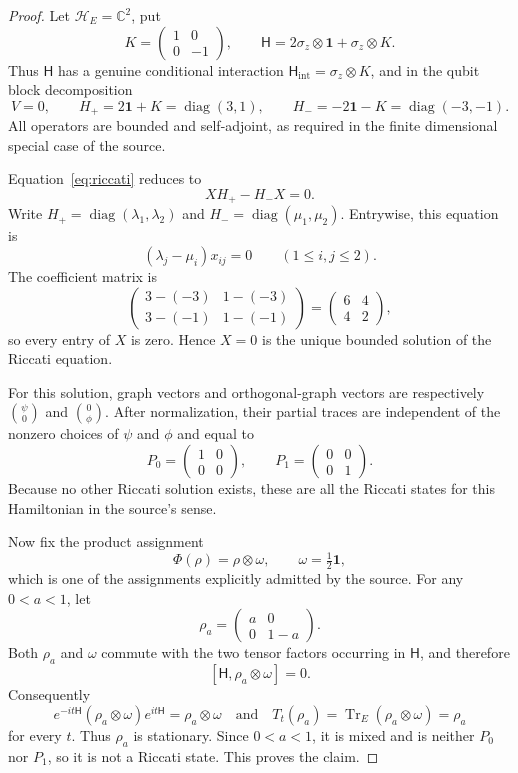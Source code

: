 \documentclass[11pt]{article}
\newcommand{\C}{\mathbb{C}}
\newcommand{\Tr}{\operatorname{Tr}}
\newcommand{\id}{\mathbf{1}}
\newcommand{\HH}{\mathsf{H}}
\begin{document}
\begin{proof}
Let $\mathcal H_E=\C^2$, put
\[
 K=\begin{pmatrix}1&0\\0&-1\end{pmatrix},\qquad
 \HH=2\sigma_z\otimes\id+\sigma_z\otimes K.
\]
Thus $\HH$ has a genuine conditional interaction
$\HH_{\mathrm{int}}=\sigma_z\otimes K$, and in the qubit block decomposition
\[
 V=0,\qquad
 H_+=2\id+K=\operatorname{diag}(3,1),\qquad
 H_-=-2\id-K=\operatorname{diag}(-3,-1).
\]
All operators are bounded and self-adjoint, as required in the finite
dimensional special case of the source.

Equation~\eqref{eq:riccati} reduces to
\[
 XH_+-H_-X=0.
\]
Write $H_+=\operatorname{diag}(\lambda_1,\lambda_2)$ and
$H_-=\operatorname{diag}(\mu_1,\mu_2)$. Entrywise, this equation is
\[
 (\lambda_j-\mu_i)x_{ij}=0\qquad(1\le i,j\le2).
\]
The coefficient matrix is
\[
 \begin{pmatrix}3-(-3)&1-(-3)\\3-(-1)&1-(-1)\end{pmatrix}
 =\begin{pmatrix}6&4\\4&2\end{pmatrix},
\]
so every entry of $X$ is zero. Hence $X=0$ is the unique bounded solution of
the Riccati equation.

For this solution, graph vectors and orthogonal-graph vectors are respectively
$\binom{\psi}{0}$ and $\binom{0}{\phi}$. After normalization, their partial
traces are independent of the nonzero choices of $\psi$ and $\phi$ and equal
to
\[
 P_0=\begin{pmatrix}1&0\\0&0\end{pmatrix},\qquad
 P_1=\begin{pmatrix}0&0\\0&1\end{pmatrix}.
\]
Because no other Riccati solution exists, these are all the Riccati states for
this Hamiltonian in the source's sense.

Now fix the product assignment
\[
 \Phi(\rho)=\rho\otimes\omega,\qquad \omega=\tfrac12\id,
\]
which is one of the assignments explicitly admitted by the source. For any
$0<a<1$, let
\[
 \rho_a=\begin{pmatrix}a&0\\0&1-a\end{pmatrix}.
\]
Both $\rho_a$ and $\omega$ commute with the two tensor factors occurring in
$\HH$, and therefore
\[
 [\HH,\rho_a\otimes\omega]=0.
\]
Consequently
\[
 e^{-it\HH}(\rho_a\otimes\omega)e^{it\HH}=\rho_a\otimes\omega
 \quad\text{and}\quad
 T_t(\rho_a)=\Tr_E(\rho_a\otimes\omega)=\rho_a
\]
for every $t$. Thus $\rho_a$ is stationary. Since $0<a<1$, it is mixed and is
neither $P_0$ nor $P_1$, so it is not a Riccati state. This proves the claim.
\end{proof}
\end{document}

